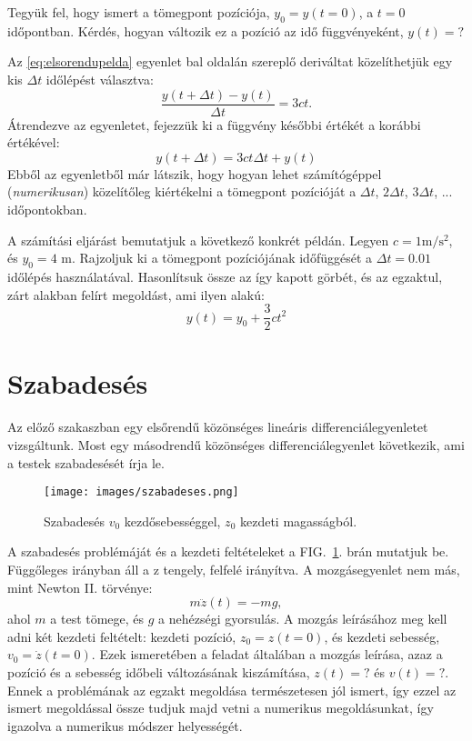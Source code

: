 \documentclass[%
 reprint,onecolumn,
 amsmath,amssymb,
 aps,
]{revtex4-2}
\begin{document}
Tegyük fel, hogy ismert a tömegpont
pozíciója, $y_0 = y(t=0)$, 
a $t=0$ időpontban. 
Kérdés, hogyan változik ez a pozíció
az idő függvényeként, $y(t) = ?$

Az \eqref{eq:elsorendupelda} egyenlet
bal oldalán szereplő deriváltat közelíthetjük
egy kis $\Delta t$ időlépést választva:
\begin{equation}
    \frac{y(t+\Delta t)-y(t)}{\Delta t} = 3 c t.
\end{equation}
Átrendezve az egyenletet, fejezzük ki a függvény későbbi értékét 
a korábbi értékével:
\begin{equation}
    y(t+\Delta t) = 3 c t \Delta t + y(t)
\end{equation}
Ebből az egyenletből már látszik, hogy hogyan
lehet számítógéppel (\emph{numerikusan}) 
közelítőleg kiértékelni a tömegpont
pozícióját a $\Delta t$, $2 \Delta t$, $3\Delta t$,
... időpontokban. 

A számítási eljárást bemutatjuk a következő
konkrét példán. Legyen $c=1 \text{m}/\text{s}^2$,
és $y_0 = 4$ m. 
Rajzoljuk ki a tömegpont pozíciójának
időfüggését a $\Delta t = 0.01$ időlépés
használatával. 
Hasonlítsuk össze az így kapott görbét, és
az egzaktul, zárt alakban felírt megoldást, 
ami ilyen alakú:
\begin{equation}
    y(t) = y_0 + \frac{3}{2} c t^2
\end{equation}

\section{Szabadesés}

Az előző szakaszban egy elsőrendű közönséges
lineáris differenciálegyenletet vizsgáltunk. 
Most egy másodrendű közönséges differenciálegyenlet
következik, ami a testek szabadesését írja le. 


\begin{figure}[h]
\texttt{[image: images/szabadeses.png]}
\caption{Szabadesés $v_0$ kezdősebességgel, $z_0$ kezdeti
magasságból.\label{fig:szabadeses}}
\end{figure}

A szabadesés problémáját és a kezdeti feltételeket
a FIG.~\ref{fig:szabadeses}. brán mutatjuk be.
Függőleges irányban áll a z tengely,
felfelé irányítva. 
A mozgásegyenlet nem más, mint Newton II. törvénye:
\begin{equation}
    m \ddot{z}(t) = - m g,
\end{equation}
ahol $m$ a test tömege, és $g$ a nehézségi 
gyorsulás. 
A mozgás leírásához meg kell adni 
két kezdeti feltételt: 
kezdeti pozíció, $z_0 = z(t=0)$, 
és 
kezdeti sebesség, $v_0 = \dot{z}(t=0)$.
Ezek ismeretében a feladat általában 
a mozgás leírása, azaz a pozíció és a 
sebesség időbeli változásának 
kiszámítása, $z(t)= ? $ és $v(t) = ?$.
Ennek a problémának az egzakt megoldása természetesen 
jól ismert, így ezzel az ismert megoldással össze tudjuk 
majd vetni a numerikus megoldásunkat, így igazolva
a numerikus módszer helyességét. 
\end{document}
